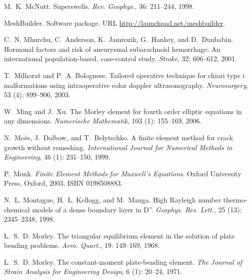 \begin{thebibliography}{467}
M.~K. McNutt.
\newblock Superswells.
\newblock \emph{Rev. Geophys.}, 36: 211--244, 1998.

MeshBuilder.
\newblock Software package.
\newblock URL \url{http://launchpad.net/meshbuilder}.

C.~N. Mhurchu, C.~Anderson, K.~Jamrozik, G.~Hankey, and D.~Dunbabin.
\newblock Hormonal factors and risk of aneurysmal subarachnoid hemorrhage: An
  international population-based, case-control study.
\newblock \emph{Stroke}, 32: 606--612, 2001.

T.~Milhorat and P.~A. Bolognese.
\newblock Tailored operative technique for chiari type i malformations using
  intraoperative color doppler ultrasonography.
\newblock \emph{Neurosurgery}, 53 (4): 899--906, 2003.

W.~Ming and J.~Xu.
\newblock The {M}orley element for fourth order elliptic equations in any
  dimensions.
\newblock \emph{Numerische Mathematik}, 103 (1): 155--169,
  2006.

N.~Mo\"es, J.~Dolbow, and T.~Belytschko.
\newblock A finite element method for crack growth without remeshing.
\newblock \emph{International Journal for Numerical Methods in Engineering},
  46 (1): 231--150, 1999.

P.~Monk.
\newblock \emph{Finite Element Methods for {M}axwell's Equations}.
\newblock Oxford University Press, Oxford, 2003.
\newblock ISBN 0198508883.

N.~L. Montague, H.~L. Kellogg, and M.~Manga.
\newblock High {R}ayleigh number thermo-chemical models of a dense boundary
  layer in {D''}.
\newblock \emph{Geophys. Res. Lett.}, 25 (13): 2345--2348,
  1998.

L.~S.~D. Morley.
\newblock The triangular equilibrium element in the solution of plate bending
  problems.
\newblock \emph{Aero. Quart.}, 19: 149--169, 1968.

L.~S.~D. Morley.
\newblock The constant-moment plate-bending element.
\newblock \emph{The Journal of Strain Analysis for Engineering Design},
  6 (1): 20--24, 1971.


\end{thebibliography}
